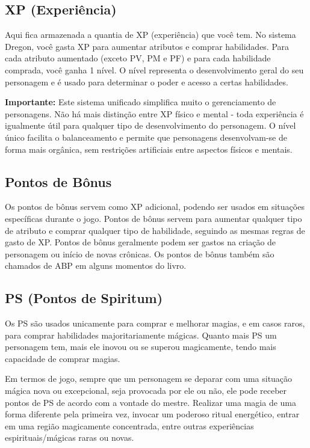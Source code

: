 \subsection{XP (Experiência)}    

Aqui fica armazenada a quantia de XP (experiência) que você tem. No sistema Dregon, você gasta XP para aumentar atributos e comprar habilidades. Para cada atributo aumentado (exceto PV, PM e PF) e para cada habilidade comprada, você ganha 1 nível. O nível representa o desenvolvimento geral do seu personagem e é usado para determinar o poder e acesso a certas habilidades.

\textbf{Importante:} Este sistema unificado simplifica muito o gerenciamento de personagens. Não há mais distinção entre XP físico e mental - toda experiência é igualmente útil para qualquer tipo de desenvolvimento do personagem. O nível único facilita o balanceamento e permite que personagens desenvolvam-se de forma mais orgânica, sem restrições artificiais entre aspectos físicos e mentais.

\subsection{Pontos de Bônus}

Os pontos de bônus servem como XP adicional, podendo ser usados em situações específicas durante o jogo. Pontos de bônus servem para aumentar qualquer tipo de atributo e comprar qualquer tipo de habilidade, seguindo as mesmas regras de gasto de XP. Pontos de bônus geralmente podem ser gastos na criação de personagem ou início de novas crônicas. Os pontos de bônus também são chamados de ABP em alguns momentos do livro.


\subsection{PS (Pontos de Spiritum)}

	Os PS são usados unicamente para comprar e melhorar magias, e em casos raros, para comprar habilidades majoritariamente mágicas. Quanto mais PS um personagem tem, mais ele inovou ou se superou magicamente, tendo mais capacidade de comprar magias.
	

	Em termos de jogo, sempre que um personagem se deparar com uma situação mágica nova ou excepcional, seja provocada por ele ou não, ele pode receber pontos de PS de acordo com a vontade do mestre. Realizar uma magia de uma forma diferente pela primeira vez, invocar um poderoso ritual energético, entrar em uma região magicamente concentrada, entre outras experiências espirituais/mágicas raras ou novas. 
	

